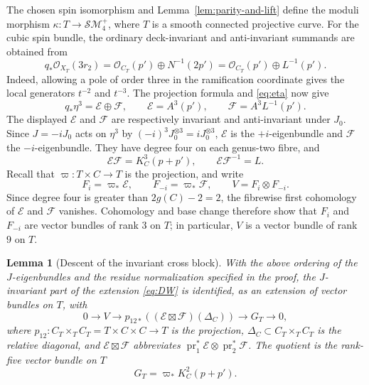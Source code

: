 \documentclass[11pt,a4paper,dvipsnames]{amsart}
\numberwithin{equation}{section}
\theoremstyle{plain}
\newtheorem{lemma}[theorem]{Lemma}
\theoremstyle{definition}
\newcommand{\cO}{\mathcal O}
\newcommand{\cE}{\mathcal E}
\newcommand{\cF}{\mathcal F}
\newcommand{\SM}{\mathcal S\mathcal M}
\begin{document}
The chosen spin isomorphism and Lemma~\ref{lem:parity-and-lift}
define the moduli morphism $\kappa:T\to\SM_4^+$, where $T$ is a smooth
connected projective curve.  For the cubic spin bundle, the ordinary
deck-invariant and anti-invariant summands are obtained from
$$
 q_*\cO_{X_T}(3r_2)
 =\cO_{C_T}(p')\oplus N^{-1}(2p')
 =\cO_{C_T}(p')\oplus L^{-1}(p').
$$
Indeed, allowing a pole of order three in the ramification coordinate
gives the local generators $t^{-2}$ and $t^{-3}$.
The projection formula and \eqref{eq:eta} now give
\begin{equation}\label{eq:E-F}
 q_*\eta^3=\cE\oplus\cF,
 \qquad
 \cE=A^3(p'),
 \qquad
 \cF=A^3L^{-1}(p').
\end{equation}
The displayed $\cE$ and $\cF$ are respectively invariant and
anti-invariant under $J_0$.  Since $J=-iJ_0$ acts on $\eta^3$ by
$(-i)^3J_0^{\otimes3}=iJ_0^{\otimes3}$, $\cE$ is the $+i$-eigenbundle
and $\cF$ the $-i$-eigenbundle.  They have degree four on
each genus-two fibre, and
\begin{equation}\label{eq:EF-ratio}
 \cE\cF=K_C^3(p+p'),
 \qquad
 \cE\cF^{-1}=L.
\end{equation}
Recall that $\varpi:T\times C\to T$ is the projection, and write
$$
 F_i=\varpi_*\cE,
 \qquad
 F_{-i}=\varpi_*\cF,
 \qquad
 V=F_i\otimes F_{-i}.
$$
Since degree four is greater than $2g(C)-2=2$, the fibrewise first
cohomology of $\cE$ and $\cF$ vanishes.  Cohomology and base change
therefore show that $F_i$ and $F_{-i}$ are vector bundles of rank $3$ on
$T$; in particular, $V$ is a vector bundle of rank $9$ on $T$.

\begin{lemma}[Descent of the invariant cross block]
\label{lem:cross-block}
With the above ordering of the $J$-eigenbundles and the residue
normalization specified in the proof, the $J$-invariant part of the
extension \eqref{eq:DW} is identified,
as an extension of vector bundles on $T$, 
with
\begin{equation}\label{eq:cross-block}
0\longrightarrow V
\longrightarrow
p_{12*}\!\left((\cE\boxtimes\cF)(\Delta_C)\right)
\longrightarrow G_T\longrightarrow0,
\end{equation}
where
$p_{12}:C_T\times_T C_T=T\times C\times C\to T$ is the projection,
$\Delta_C\subset C_T\times_T C_T$ is the relative diagonal, and
$\cE\boxtimes\cF$ abbreviates
$\operatorname{pr}_1^*\cE\otimes\operatorname{pr}_2^*\cF$.  The quotient
is the rank-five vector bundle on $T$
\begin{equation}\label{eq:GT}
 G_T=\varpi_*K_C^2(p+p').
\end{equation}
\end{lemma}
\end{document}
